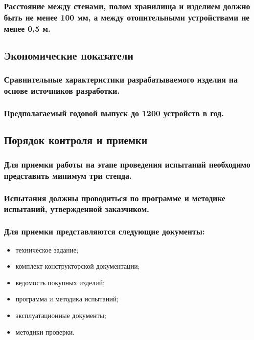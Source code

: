 \documentclass[a4paper]{bsuir-tor}
\begin{document}
\subsubsection{Расстояние между стенами, полом хранилища
  и изделием должно быть не менее 100 мм, а между отопительными
  устройствами не менее 0,5 м.}

\subsection{Экономические показатели}

\subsubsection{Сравнительные характеристики разрабатываемого
  изделия на основе источников разработки.}

\subsubsection{Предполагаемый годовой выпуск до 1200 устройств в год. }

\subsection{Порядок контроля и приемки}

\subsubsection{Для приемки работы на этапе проведения испытаний
  необходимо представить минимум три стенда.}

\subsubsection{Испытания должны проводиться по программе и методике испытаний,
  утвержденной заказчиком.}

\subsubsection{Для приемки представляются следующие документы:}
\begin{itemize}
\item техническое задание;  
\item комплект конструкторской документации;  
\item ведомость покупных изделий;  
\item программа и методика испытаний;  
\item эксплуатационные документы;  
\item методики проверки.  
\end{itemize}
\end{document}
